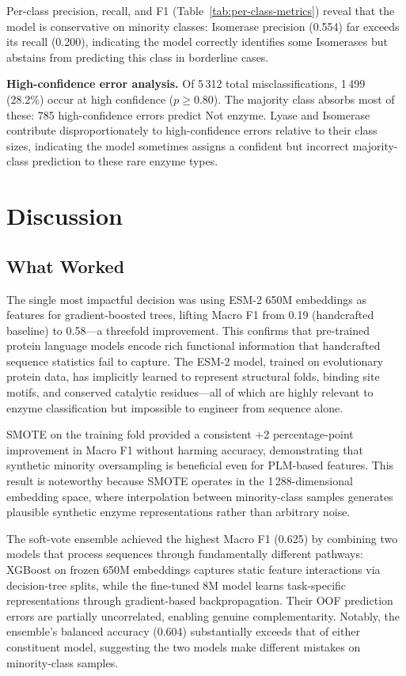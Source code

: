 \documentclass[11pt,a4paper]{article}
\begin{document}
Per-class precision, recall, and F1 (Table~\ref{tab:per-class-metrics}) reveal that the model is conservative on minority
classes: Isomerase precision (0.554) far exceeds its recall (0.200), indicating the model
correctly identifies some Isomerases but abstains from predicting this class in borderline cases.

\textbf{High-confidence error analysis.}
Of 5\,312 total misclassifications, 1\,499 (28.2\%) occur at high confidence ($p \ge 0.80$).
The majority class absorbs most of these: 785 high-confidence errors predict Not enzyme.
Lyase and Isomerase contribute disproportionately to high-confidence errors relative to their
class sizes, indicating the model sometimes assigns a confident but incorrect majority-class
prediction to these rare enzyme types.

\section{Discussion}
\subsection{What Worked}
The single most impactful decision was using ESM-2 650M embeddings as features for
gradient-boosted trees, lifting Macro F1 from 0.19 (handcrafted baseline) to 0.58---a
threefold improvement.
This confirms that pre-trained protein language models encode rich functional information that
handcrafted sequence statistics fail to capture.
The ESM-2 model, trained on evolutionary protein data, has implicitly learned to represent
structural folds, binding site motifs, and conserved catalytic residues---all of which are
highly relevant to enzyme classification but impossible to engineer from sequence alone.

SMOTE on the training fold provided a consistent $+$2 percentage-point improvement in Macro F1
without harming accuracy, demonstrating that synthetic minority oversampling is beneficial even
for PLM-based features.
This result is noteworthy because SMOTE operates in the 1\,288-dimensional embedding space,
where interpolation between minority-class samples generates plausible synthetic enzyme
representations rather than arbitrary noise.

The soft-vote ensemble achieved the highest Macro F1 (0.625) by combining two models that
process sequences through fundamentally different pathways: XGBoost on frozen 650M embeddings
captures static feature interactions via decision-tree splits, while the fine-tuned 8M model
learns task-specific representations through gradient-based backpropagation.
Their OOF prediction errors are partially uncorrelated, enabling genuine complementarity.
Notably, the ensemble's balanced accuracy (0.604) substantially exceeds that of either
constituent model, suggesting the two models make different mistakes on minority-class samples.
\end{document}
